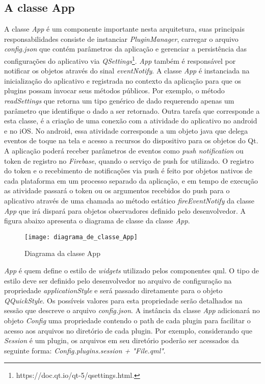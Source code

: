 \subsection{A classe App}\label{sec:solucao-desenvolvida}
A classe \textit{App} é um componente importante nesta arquitetura, suas principais responsabilidades consiste de instanciar \textit{PluginManager}, carregar o arquivo \textit{config.json} que contém parâmetros da aplicação e gerenciar a persistência das configurações do aplicativo via \textit{QSettings}\footnote{https://doc.qt.io/qt-5/qsettings.html.}. \textit{App} também é responsável por notificar os objetos através do sinal \textit{eventNotify}. A classe \textit{App} é instanciada na inicialização do aplicativo e registrada no contexto da aplicação para que os plugins possam invocar seus métodos públicos. Por exemplo, o método \textit{readSettings} que retorna um tipo genérico de dado requerendo apenas um parâmetro que identifique o dado a ser retornado. Outra tarefa que corresponde a esta classe, é a criação de uma conexão com a atividade do aplicativo no android e no iOS. No android, essa atividade corresponde a um objeto java que delega eventos de toque na tela e acesso a recursos do dispositivo para os objetos do Qt. A aplicação poderá receber parâmetros de eventos como \textit{push notification} ou token de registro no \textit{Firebase}, quando o serviço de push for utilizado. O registro do token e o recebimento de notificações via push é feito por objetos nativos de cada plataforma em um processo separado da aplicação, e em tempo de execução as atividade passará o token ou os argumentos recebidos do push para o aplicativo através de uma chamada ao método estático \textit{fireEventNotify} da classe \textit{App} que irá dispará para objetos observadores definido pelo desenvolvedor. A figura abaixo apresenta o diagrama de classe da classe \textit{App}.

\begin{figure}[H]
	\texttt{[image: diagrama\_de\_classe\_App]}
	\centering
	\caption{Diagrama da classe App}
\end{figure}

\textit{App} é quem define o estilo de \textit{widgets} utilizado pelos componentes qml. O tipo de estilo deve ser definido pelo desenvolvedor no arquivo de configuração na propriedade \textit{applicationStyle} e será passado diretamente para o objeto \textit{QQuickStyle}. Os possíveis valores para esta propriedade serão detalhados na sessão que descreve o arquivo \textit{config.json}. A instância da classe \textit{App} adicionará no objeto \textit{Config} uma propriedade contendo o path de cada plugin para facilitar o acesso aos arquivos no diretório de cada plugin. Por exemplo, considerando que \textit{Session} é um plugin, os arquivos em seu diretório poderão ser acessados da seguinte forma: \textit{Config.plugins.session + "File.qml"}.


